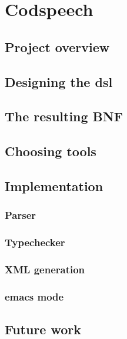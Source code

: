 \chapter{Codspeech}
\lipsum

\section{Project overview}

\section{Designing the dsl}

\section{The resulting BNF}

\section{Choosing tools}

\section{Implementation}

\subsection{Parser}
\subsection{Typechecker}
\subsection{XML generation}
\subsection{emacs mode}

\section{Future work}
